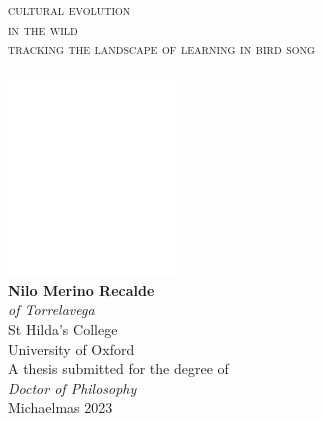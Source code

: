 
\thispagestyle{empty}
\pagecolor{chapterback}
\onecolumn
\normalsize
\begin{center}
    \color{white}
    \vspace*{1cm} %
    \begin{center}
        {\fontsize{40pt}{34pt}\selectfont\textsc{cultural evolution\\in the wild}\\[.5cm]\fontsize{15pt}{20pt}\selectfont\textsc{tracking the landscape of learning in bird song}\\}
    \end{center}
    \vspace{8cm} 
    \includegraphics[width=4.5cm]{figures/logos/oxlogo-round.png}\\
    \vspace{1cm} 
    \large
    \textbf{Nilo Merino Recalde}\\
    \textit{of Torrelavega}\\
    St Hilda's College\\
    University of Oxford\\

    \vskip 10pt
    A thesis submitted for the degree of\\
    \textit{Doctor of Philosophy}\\
    Michaelmas 2023

\end{center}
\restoregeometry

